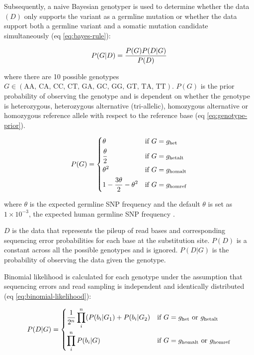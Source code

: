 Subsequently, a naive Bayesian genotyper is used to determine whether the data $(D)$ only supports the variant as a germline mutation or whether the data support both a germline variant and a somatic mutation candidate simultaneously (eq \ref{eq:bayes-rule}):

\begin{equation} \label{eq:bayes-rule}
P(G|D) = \frac{P(G)P(D|G)}{P(D)} \smallskip
\end{equation}

where there are 10 possible genotypes $G \in (\text{AA, CA, CC, CT, GA, GC, GG, GT, TA, TT})$. $P(G)$ is the prior probability of observing the genotype and is dependent on whether the genotype is heterozygous, heterozygous alternative (tri-allelic), homozygous alternative or homozygous reference allele with respect to the reference base (eq \ref{eq:genotype-prior}).  

\begin{equation} \label{eq:genotype-prior}
 P(G)= 
 	\begin{dcases}
    	\theta & \text{if } G = g_{\text{het}} \\
	    \frac{\theta}{2} & \text{if } G = g_{\text{hetalt}} \\
		\theta^{2} & \text{if } G = g_{\text{homalt}} \\
		1 - \frac{3\theta}{2} - \theta^{2} & \text{if } G = g_{\text{homref}} \\
	\end{dcases} \smallskip
\end{equation}

where $\theta$ is the expected germline SNP frequency and the default $\theta$ is set as $1\times10^{-3}$, the expected human germline SNP frequency \cite{1000_Genomes_Project_Consortium2012-rj}. 

$D$ is the data that represents the pileup of read bases and corresponding sequencing error probabilities for each base at the substitution site. $P(D)$ is a constant across all the possible genotypes and is ignored. $P(D|G)$ is the probability of observing the data given the genotype. 

Binomial likelihood is calculated for each genotype under the assumption that sequencing errors and read sampling is independent and identically distributed (eq \ref{eq:binomial-likelihood}):

\begin{equation} \label{eq:binomial-likelihood}
P(D|G) =  
	\begin{dcases}
    	\frac{1}{2^n}\prod_{i}^{n} (P(b_{i}|G_1) + P(b_{i}|G_2) & \text{if } G = g_{\text{het}} \text{ or } g_{\text{hetalt}} \\
	    \prod_{i}^{n} P(b_{i}|G) & \text{if } G = g_{\text{homalt}} \text{ or } g_{\text{homref}} \\
	\end{dcases}
\end{equation}

